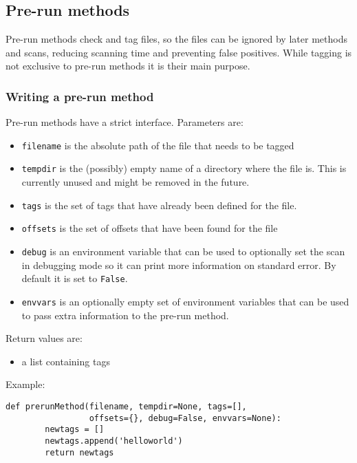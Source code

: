 \documentclass[10pt]{article}
\begin{document}
\subsection{Pre-run methods}

Pre-run methods check and tag files, so the files can be ignored by later
methods and scans, reducing scanning time and preventing false positives. While
tagging is not exclusive to pre-run methods it is their main purpose.

\subsubsection{Writing a pre-run method}

Pre-run methods have a strict interface. Parameters are:

\begin{itemize}
\item \texttt{filename} is the absolute path of the file that needs to be tagged
\item \texttt{tempdir} is the (possibly) empty name of a directory where the
file is. This is currently unused and might be removed in the future.
\item \texttt{tags} is the set of tags that have already been defined for the
file.
\item \texttt{offsets} is the set of offsets that have been found for the file
\item \texttt{debug} is an environment variable that can be used to optionally
set the scan in debugging mode so it can print more information on standard
error. By default it is set to \texttt{False}.
\item \texttt{envvars} is an optionally empty set of environment variables that
can be used to pass extra information to the pre-run method.
\end{itemize}

Return values are:

\begin{itemize}
\item a list containing tags
\end{itemize}

Example:

\begin{verbatim}
def prerunMethod(filename, tempdir=None, tags=[],
                 offsets={}, debug=False, envvars=None):
        newtags = []
        newtags.append('helloworld')
        return newtags
\end{verbatim}
\end{document}
